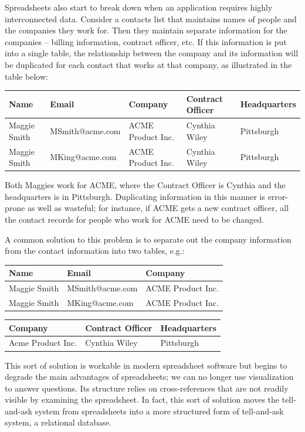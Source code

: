 Spreadsheets also start to break down when an application requires
highly interconnected data. Consider a contacts list that maintains
names of people and the companies they work for. Then they maintain
separate information for the companies -- billing information, contract
officer, etc. If this information is put into a single table, the
relationship between the company and its information will be duplicated
for each contact that works at that company, as illustrated in the table
below:

\begin{tabular}{|l l l l l|}
\hline
Name&Email&Company&Contract Officer&Headquarters\\
\hline
Maggie Smith&MSmith@acme.com&ACME Product Inc.&Cynthia Wiley&Pittsburgh\\
Maggie Smith&MKing@acme.com&ACME Product Inc.&Cynthia Wiley&Pittsburgh\\
\hline
\end{tabular}

Both Maggies work for ACME, where the Contract Officer is Cynthia and
the headquarters is in Pittsburgh. Duplicating information in this
manner is error-prone as well as wasteful; for instance, if ACME gets a
new contract officer, all the contact records for people who work for
ACME need to be changed.

A common solution to this problem is to separate out the company
information from the contact information into two tables, e.g.:

\begin{tabular}{|lll|}
\hline
Name&Email&Company\\
\hline
Maggie Smith&MSmith@acme.com&ACME Product Inc. \\
Maggie Smith&MKing@acme.com&ACME Product Inc. \\
\hline
\end{tabular}

\phantom{I}

\begin{tabular}{|lll|}
\hline
Company&Contract Officer&Headquarters\\
\hline
Acme Product Inc.&Cynthia Wiley&Pittsburgh\\
\hline
\end{tabular}



This sort of solution is workable in modern spreadsheet software but
begins to degrade the main advantages of spreadsheets; we can no longer
use visualization to answer questions. Its structure relies on
cross-references that are not readily visible by examining the
spreadsheet. In fact, this sort of solution moves the tell-and-ask
system from spreadsheets into a more structured form of tell-and-ask
system, a relational database.

